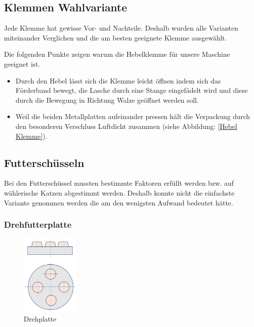 \subsection{Klemmen Wahlvariante}

Jede Klemme hat gewisse Vor- und Nachteile. Deshalb wurden alle Varianten miteinander Verglichen und die am besten geeignete Klemme ausgewählt.

Die folgenden Punkte zeigen warum die Hebelklemme für unsere Maschine geeignet ist.

\begin{itemize}
\item Durch den Hebel lässt sich die Klemme leicht öffnen indem sich das Förderband bewegt, die Lasche durch eine Stange eingefädelt wird und diese durch die Bewegung in Richtung Walze geöffnet werden soll.
\item Weil die beiden Metallplatten aufeinander pressen hält die Verpackung durch den besonderen Verschluss Luftdicht zusammen (siehe Abbildung: \ref{Hebel Klemme}). 

\end{itemize} 

\subsection{Futterschüsseln}

Bei den Futterschüssel mussten bestimmte Faktoren erfüllt werden bzw. auf wählerische Katzen abgestimmt werden. Deshalb konnte nicht die einfachste Variante genommen werden die am  den wenigsten Aufwand bedeutet hätte. 

\subsubsection{Drehfutterplatte}

\begin{figure}
\vspace{-40pt}
  \begin{center}
    \includegraphics[width=0.25\textwidth]{Bilder/Powerpoint/Drehplatte}
  \end{center}
  \caption{Drehplatte}
  \label{Drehplatte}
  \vspace{-20pt}
\end{figure}

